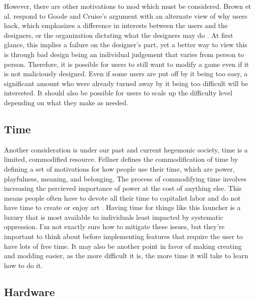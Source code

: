 \documentclass[10pt,twocolumn]{article}
\begin{document}
However, there are other motivations to mod which must be considered.
Brown et al. respond to Goode and Cruise's argument with an alternate view of
why users hack, which emphasizes a difference in interests between the users and
the designers, or the organization dictating what the designers may do
\cite{brown_why_2022}. At first glance, this implies a failure on the designer's
part, yet a better way to view this is through bad design being an individual
judgement that varies from person to person. Therefore, it is possible for users
to still want to modify a game even if it is not maliciously designed.
Even if some users are put off by it being too easy, a significant amount who
were already turned away by it being too difficult will be interested. It should
also be possible for users to scale up the difficulty level depending on what
they make as needed.

\subsection{Time}

Another consideration is under our past and current hegemonic society, time is a
limited, commodified resource. Fellner defines the commodification of time by
defining a set of motivations for how people use their time, which are power,
playfulness, meaning, and belonging. The process of commodifying time involves
increasing the percieved importance of power at the cost of anything else. This
means people often have to devote all their time to capitalist labor and do not
have time to create or enjoy art \cite{fellner_value_2017}. Having time for
things like this launcher is a luxury that is most available to individuals
least impacted by systematic oppression. I'm not exactly sure how to mitigate
these issues, but they're important to think about before implementing features
that require the user to have lots of free time. It may also be another point in
favor of making creating and modding easier, as the more
difficult it is, the more time it will take to learn how to do it.

\subsection{Hardware}
\end{document}
